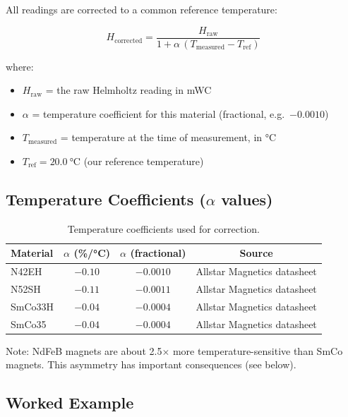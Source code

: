 \documentclass[11pt,letterpaper]{article}
\begin{document}
All readings are corrected to a common reference temperature:

\begin{equation*}
H_{\mathrm{corrected}} = \frac{H_{\mathrm{raw}}}{1 + \alpha \,(T_{\mathrm{measured}} - T_{\mathrm{ref}})}
\end{equation*}

where:
\begin{itemize}[nosep]
  \item $H_{\mathrm{raw}}$ = the raw Helmholtz reading in mWC
  \item $\alpha$ = temperature coefficient for this material (fractional, e.g.\ $-0.0010$)
  \item $T_{\mathrm{measured}}$ = temperature at the time of measurement, in \si{\degreeCelsius}
  \item $T_{\mathrm{ref}} = \SI{20.0}{\degreeCelsius}$ (our reference temperature)
\end{itemize}

\subsection{Temperature Coefficients ($\alpha$ values)}

\begin{table}[htbp]
\centering
\caption{Temperature coefficients used for correction.}
\label{tab:alpha}
\begin{tabular}{@{}lccc@{}}
\toprule
Material & $\alpha$ (\%/\si{\degreeCelsius}) & $\alpha$ (fractional) & Source \\
\midrule
N42EH   & $-0.10$ & $-0.0010$ & Allstar Magnetics datasheet \\
N52SH   & $-0.11$ & $-0.0011$ & Allstar Magnetics datasheet \\
SmCo33H & $-0.04$ & $-0.0004$ & Allstar Magnetics datasheet \\
SmCo35  & $-0.04$ & $-0.0004$ & Allstar Magnetics datasheet \\
\bottomrule
\end{tabular}
\end{table}

Note: NdFeB magnets are about 2.5$\times$ more temperature-sensitive than SmCo
magnets. This asymmetry has important consequences (see below).

\subsection{Worked Example}
\end{document}
